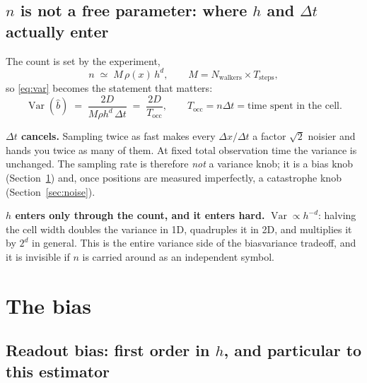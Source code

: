 \documentclass[11pt,a4paper]{article}
\newcommand{\dx}{\Delta x}
\newcommand{\dt}{\Delta t}
\begin{document}
\subsection{$n$ is not a free parameter: where $h$ and $\dt$ actually enter}

The count is set by the experiment,
\begin{equation}
  n \;\simeq\; M\,\rho(x)\,h^{d},\qquad M=N_{\text{walkers}}\times T_{\text{steps}} ,
\end{equation}
so \eqref{eq:var} becomes the statement that matters:
\begin{equation}\boxed{
  \operatorname{Var}(\hat b)\;=\;\frac{2D}{M\rho h^{d}\,\dt}\;=\;\frac{2D}{T_{\mathrm{occ}}},
  \qquad T_{\mathrm{occ}} = n\dt = \text{time spent in the cell.}
  \label{eq:occ}
}\end{equation}

\begin{keybox}
\textbf{$\dt$ cancels.} Sampling twice as fast makes every $\dx/\dt$ a factor
$\sqrt2$ noisier and hands you twice as many of them. At fixed total observation
time the variance is unchanged. The sampling rate is therefore \emph{not} a
variance knob; it is a bias knob (Section~\ref{sec:bias}) and, once positions are
measured imperfectly, a catastrophe knob (Section~\ref{sec:noise}).

\textbf{$h$ enters only through the count, and it enters hard.} $\operatorname{Var}\propto h^{-d}$:
halving the cell width doubles the variance in 1D, quadruples it in 2D, and multiplies it
by $2^{d}$ in general. This is the entire variance side of the bias\textendash variance
tradeoff, and it is invisible if $n$ is carried around as an independent symbol.
\end{keybox}

\section{The bias}
\label{sec:bias}

\subsection{Readout bias: first order in $h$, and particular to this estimator}
\end{document}
